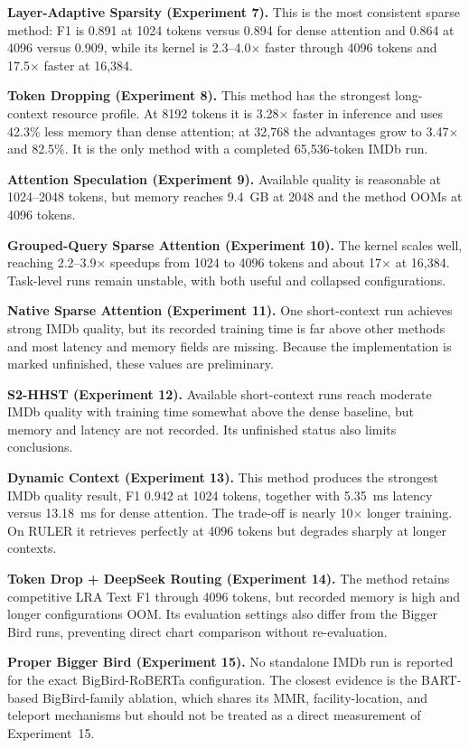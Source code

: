 \documentclass[11pt]{article}
\begin{document}
\textbf{Layer-Adaptive Sparsity (Experiment 7).} This is the most consistent
sparse method: F1 is 0.891 at 1024 tokens versus 0.894 for dense attention and
0.864 at 4096 versus 0.909, while its kernel is 2.3--4.0$\times$ faster through
4096 tokens and 17.5$\times$ faster at 16{,}384.

\textbf{Token Dropping (Experiment 8).} This method has the strongest
long-context resource profile. At 8192 tokens it is 3.28$\times$ faster in
inference and uses 42.3\% less memory than dense attention; at 32{,}768 the
advantages grow to 3.47$\times$ and 82.5\%. It is the only method with a
completed 65{,}536-token IMDb run.

\textbf{Attention Speculation (Experiment 9).} Available quality is
reasonable at 1024--2048 tokens, but memory reaches 9.4~GB at 2048 and the
method OOMs at 4096 tokens.

\textbf{Grouped-Query Sparse Attention (Experiment 10).} The kernel scales
well, reaching 2.2--3.9$\times$ speedups from 1024 to 4096 tokens and about
17$\times$ at 16{,}384. Task-level runs remain unstable, with both useful and
collapsed configurations.

\textbf{Native Sparse Attention (Experiment 11).} One short-context run
achieves strong IMDb quality, but its recorded training time is far above
other methods and most latency and memory fields are missing. Because the
implementation is marked unfinished, these values are preliminary.

\textbf{S2-HHST (Experiment 12).} Available short-context runs reach moderate
IMDb quality with training time somewhat above the dense baseline, but memory
and latency are not recorded. Its unfinished status also limits conclusions.

\textbf{Dynamic Context (Experiment 13).} This method produces the strongest
IMDb quality result, F1 0.942 at 1024 tokens, together with 5.35~ms latency
versus 13.18~ms for dense attention. The trade-off is nearly 10$\times$ longer
training. On RULER it retrieves perfectly at 4096 tokens but degrades sharply
at longer contexts.

\textbf{Token Drop + DeepSeek Routing (Experiment 14).} The method retains
competitive LRA Text F1 through 4096 tokens, but recorded memory is high and
longer configurations OOM. Its evaluation settings also differ from the
Bigger Bird runs, preventing direct chart comparison without re-evaluation.

\textbf{Proper Bigger Bird (Experiment 15).} No standalone IMDb run is
reported for the exact BigBird-RoBERTa configuration. The closest evidence is
the BART-based BigBird-family ablation, which shares its MMR,
facility-location, and teleport mechanisms but should not be treated as a
direct measurement of Experiment~15.
\end{document}
